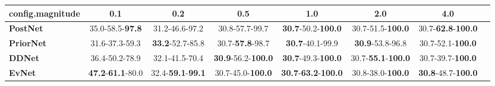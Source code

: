 \begin{tabular}{lccccccc}
\toprule
\textbf{config.magnitude} &                               0.1 &                               0.2 &                                0.5 &                                         1.0 &                                2.0 &                                4.0 \\
\midrule
\textbf{PostNet } &           35.0-58.5-\textbf{97.8} &                    31.2-46.6-97.2 &                     30.8-57.7-99.7 &           \textbf{30.7}-50.2-\textbf{100.0} &           30.7-51.5-\textbf{100.0} &  30.7-\textbf{62.8}-\textbf{100.0} \\
\textbf{PriorNet} &                    31.6-37.3-59.3 &           \textbf{33.2}-52.7-85.8 &            30.7-\textbf{57.8}-98.7 &                     \textbf{30.7}-40.1-99.9 &            \textbf{30.9}-53.8-96.8 &           30.7-52.1-\textbf{100.0} \\
\textbf{DDNet   } &                    36.4-50.2-78.9 &                    32.1-41.5-70.4 &  \textbf{30.9}-56.2-\textbf{100.0} &           \textbf{30.7}-49.3-\textbf{100.0} &  30.7-\textbf{55.1}-\textbf{100.0} &           30.7-39.7-\textbf{100.0} \\
\textbf{EvNet   } &  \textbf{47.2}-\textbf{61.1}-80.0 &  32.4-\textbf{59.1}-\textbf{99.1} &           30.7-45.0-\textbf{100.0} &  \textbf{30.7}-\textbf{63.2}-\textbf{100.0} &           30.8-38.0-\textbf{100.0} &  \textbf{30.8}-48.7-\textbf{100.0} \\
\bottomrule
\end{tabular}
